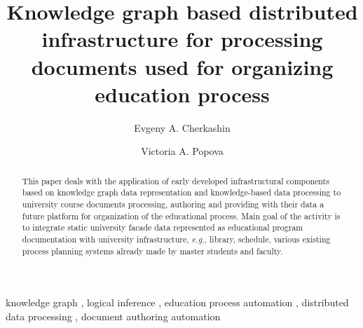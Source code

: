 \documentclass[
]{aiitart}
\newcommand{\email}[1]{\texttt{#1}}
\begin{document}


\title{Knowledge graph based distributed infrastructure for processing documents used for organizing education process}

\author[1,2]{Evgeny A. Cherkashin}
\author[2]{Victoria A. Popova}
\address[1]{Matrosov Institute for System Dynamics and Control Theory SB RAS, Irkutsk, Russia}
\address[2]{Institute of Mathematics and Information Technologies, Irkutsk State University, Irkutsk, Russia\\[0.7em]
\email{eugeneai@icc.ru};\quad\email{victorypopova1@gmail.com}}


\begin{abstract}
  This paper deals with the application of early developed infrastructural components based on knowledge graph data representation and knowledge-based data processing to university course documents processing, authoring and providing with their data a future platform for organization of the educational process.  Main goal of the activity is to integrate static university facade data represented as educational program documentation with university infrastructure, \emph{e.g.}, library, schedule, various existing process planning systems already made by master students and faculty.
\end{abstract}

\begin{keywords}
  knowledge graph \sep
  logical inference \sep
  education process automation \sep
  distributed data processing \sep
  document authoring automation
\end{keywords}
\end{document}
